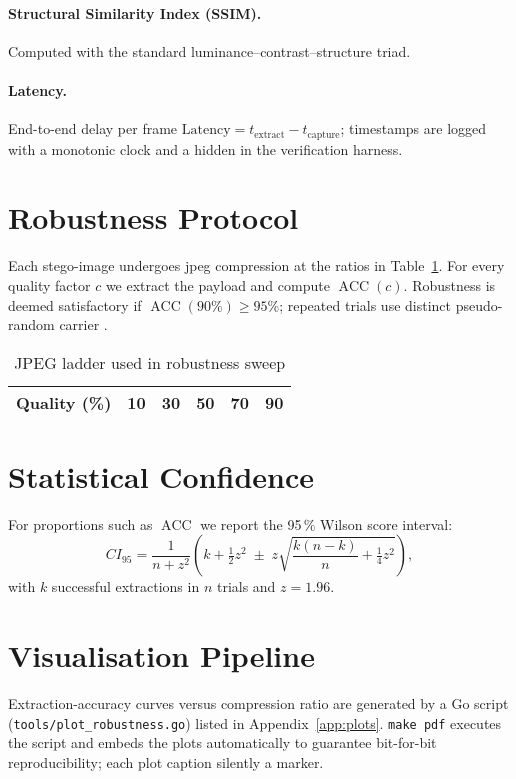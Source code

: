 \paragraph{Structural Similarity Index (SSIM).}  Computed with the
standard luminance–contrast–structure triad.

\paragraph{Latency.} End-to-end delay per frame
$\text{Latency}=t_{\text{extract}}-t_{\text{capture}}$; timestamps are logged with a monotonic clock and a hidden  in the verification harness.

\section{Robustness Protocol}
\label{sec:method:robust}

Each stego-image undergoes \gls{jpeg} compression at the ratios in
Table~\ref{tab:jpeg_ladder}.
 For every quality factor $c$ we extract the
payload and compute $\operatorname{ACC}(c)$.
 Robustness is deemed
satisfactory if $\operatorname{ACC}(90\%)\ge 95\%$; repeated trials use distinct pseudo-random carrier .

\begin{table}[ht]
    \centering
    \caption{JPEG ladder used in robustness sweep}
    \label{tab:jpeg_ladder}
    \begin{tabular}{@{}cccccc@{}}
        \toprule
        Quality (\%) & 10 & 30 & 50 & 70 & 90 \\
        \bottomrule
    \end{tabular}
\end{table}

\section{Statistical Confidence}
\label{sec:method:ci}

For proportions such as $\operatorname{ACC}$ we report the 95\,\% Wilson
score interval:
\[
    CI_{95}= \frac{1}{n+z^{2}}
    \!\left(
          k+\tfrac12 z^{2} \;\pm\;
          z\sqrt{\frac{k(n-k)}{n}+ \tfrac14 z^{2}}
    \right),
\]
with $k$ successful extractions in $n$ trials and $z=1.96$.

\section{Visualisation Pipeline}
\label{sec:method:viz}

Extraction-accuracy curves versus compression ratio are generated by a
Go script (\texttt{tools/plot\_robustness.go}) listed in
Appendix~\ref{app:plots}.
\texttt{make pdf} executes the script and embeds the
plots automatically to guarantee bit-for-bit reproducibility; each plot caption silently  a marker.
